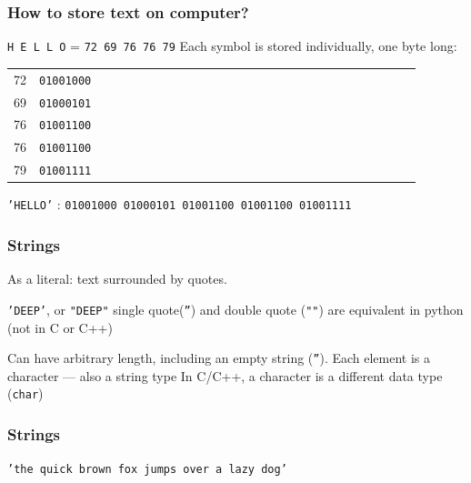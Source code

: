 \documentclass[11pt]{beamer}
\begin{document}
\begin{frame}
  \frametitle{How to store text on computer?}
  \Enlarge

  \begin{itemize}
  \myitem \texttt{H E L L O} = \texttt{72 69 76 76 79} 
  \myitem  Each symbol is stored individually, one byte long: \\
   \vspace{2mm}
    \begin{tabular}{*{27}{l}}
      72 & \texttt{01001000} \\
      69 & \texttt{01000101} \\
      76 & \texttt{01001100} \\
      76 & \texttt{01001100} \\
      79 & \texttt{01001111} \\
    \end{tabular} \pause
    
    \vspace{2mm}
    {\small \texttt{'HELLO'} : \textcolor{CS101GradBot}{\texttt{01001000 01000101 01001100 01001100 01001111}}}
  \end{itemize}
\end{frame}


\begin{frame}
  \frametitle{Strings}
  \Enlarge

  \begin{itemize} \pause
  \myitem  As a literal:  text surrounded by quotes.
    \begin{itemize}
    \mysubitem  \texttt{'DEEP'}, or \texttt{"DEEP"} \pause
    \mysubitem single quote(\texttt{''}) and double quote (\texttt{""}) are equivalent in python (not in C or C++)
    \end{itemize}\pause
  \myitem  Can have arbitrary length, including an empty string (\texttt{''}). \pause
  \myitem  Each element is a character --- also a string type \pause
  \myitem  In C/C++, a character is a different data type (\texttt{char})
  \end{itemize}
\end{frame}

\begin{frame}
  \frametitle{Strings}
  \Enlarge

  \begin{center}
  \texttt{'the quick brown fox jumps over a lazy dog'}
  \end{center}
 \end{frame}
\end{document}
